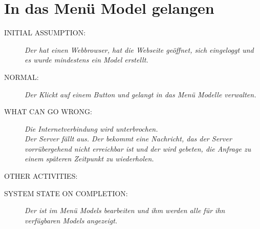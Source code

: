 \section{In das Menü Model gelangen}
\begin{description}
  \item [INITIAL ASSUMPTION:]
    \textit{Der  hat einen Webbrowser, hat die Webseite geöffnet, sich eingeloggt und es wurde mindestens ein \gls{Model} erstellt.}
  \item [NORMAL:]
    \textit{Der  Klickt auf einem Button und gelangt in das Menü Modelle verwalten.}
  \item [WHAT CAN GO WRONG:]
    \textit{Die Internetverbindung wird unterbrochen.\\
Der Server fällt aus. Der  bekommt eine Nachricht, das der Server vorrübergehend nicht erreichbar ist und der  wird gebeten, die Anfrage zu einem späteren Zeitpunkt zu wiederholen.}
  \item [OTHER ACTIVITIES:]
    \textit{}
  \item [SYSTEM STATE ON COMPLETION:]
    \textit{Der  ist im Menü \glspl{Model} bearbeiten und ihm werden alle für ihn verfügbaren \glspl{Model} angezeigt.}
\end{description}

